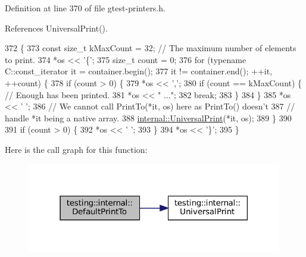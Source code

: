 Definition at line 370 of file gtest-\/printers.\+h.



References Universal\+Print().


\begin{DoxyCode}
372                                                         \{
373   \textcolor{keyword}{const} \textcolor{keywordtype}{size\_t} kMaxCount = 32;  \textcolor{comment}{// The maximum number of elements to print.}
374   *os << \textcolor{charliteral}{'\{'};
375   \textcolor{keywordtype}{size\_t} count = 0;
376   \textcolor{keywordflow}{for} (\textcolor{keyword}{typename} C::const\_iterator it = container.begin();
377        it != container.end(); ++it, ++count) \{
378     \textcolor{keywordflow}{if} (count > 0) \{
379       *os << \textcolor{charliteral}{','};
380       \textcolor{keywordflow}{if} (count == kMaxCount) \{  \textcolor{comment}{// Enough has been printed.}
381         *os << \textcolor{stringliteral}{" ..."};
382         \textcolor{keywordflow}{break};
383       \}
384     \}
385     *os << \textcolor{charliteral}{' '};
386     \textcolor{comment}{// We cannot call PrintTo(*it, os) here as PrintTo() doesn't}
387     \textcolor{comment}{// handle *it being a native array.}
388     \hyperlink{namespacetesting_1_1internal_a30708fa2bacf11895b03bdb21eb72309}{internal::UniversalPrint}(*it, os);
389   \}
390 
391   \textcolor{keywordflow}{if} (count > 0) \{
392     *os << \textcolor{charliteral}{' '};
393   \}
394   *os << \textcolor{charliteral}{'\}'};
395 \}
\end{DoxyCode}
Here is the call graph for this function\+:
\nopagebreak
\begin{figure}[H]
\begin{center}
\leavevmode
\includegraphics[width=316pt]{namespacetesting_1_1internal_ac7dfe02c4c1cbfe89c23a93d873079c5_cgraph}
\end{center}
\end{figure}
\mbox{\label{namespacetesting_1_1internal_affa1f94e3ba8db8b964553c2871bf339}} 
